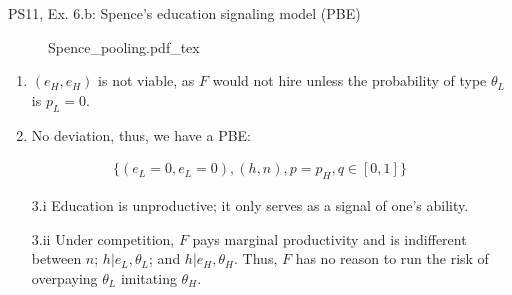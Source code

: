 \begin{frame}{PS11, Ex. 6.b: Spence’s education signaling model (PBE)}
\begin{multicols}{2}
\begin{figure}[!h]
        \center{}
        {Spence_pooling.pdf_tex}
      \end{figure}\vspace{-6pt}
      \begin{enumerate}
        \item $(e_H,e_H)$ is not viable, as $F$ would not hire unless the probability of type $\theta_L$ is $p_L=0$.
        \item \vspace{-2pt} No deviation, thus, we have a PBE:
      \end{enumerate}\vspace{-14pt}
      \begin{align*}
        \{(e_L=0,e_L=0),(h,n),p=p_H,q\in[0,1]\}
      \end{align*}\vspace{-24pt}
      \begin{itemize}
        \item[3.i] Education is unproductive; it only serves as a signal of one's ability.
        \item[3.ii] \vspace{-4pt} Under competition, $F$ pays marginal productivity and is indifferent between $n$; $h|e_L,\theta_L$; and $h|e_H,\theta_H$. Thus, $F$ has no reason to run the risk of overpaying $\theta_L$ imitating $\theta_H$.
      \end{itemize}
      \vfill\null
    \end{multicols}
\end{frame}

